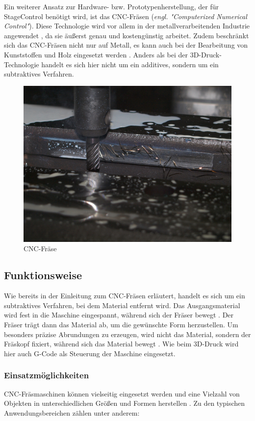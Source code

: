 Ein weiterer Ansatz zur Hardware- bzw. Prototypenherstellung, der für StageControl benötigt wird, ist das CNC-Fräsen (\textit{engl. "Computerized Numerical Control"}). Diese Technologie wird vor allem in der metallverarbeitenden Industrie angewendet \parencite{CNCFraesen}, da sie äußerst genau und kostengünstig arbeitet. Zudem beschränkt sich das CNC-Fräsen nicht nur auf Metall, es kann auch bei der Bearbeitung von Kunststoffen und Holz eingesetzt werden \parencite{CNCFraesen2}. Anders als bei der 3D-Druck-Technologie handelt es sich hier nicht um ein additives, sondern um ein subtraktives Verfahren.\\  \parencite{CNCFraesen3}


\begin{figure}[H]
	\centering
	\includegraphics[width=0.6\linewidth]{images/CNC.jpg}
	\caption[CNC-Fräse]{CNC-Fräse}
	\label{fig:cnc-fraese}
\end{figure}

\subsection{Funktionsweise}
Wie bereits in der Einleitung zum CNC-Fräsen erläutert, handelt es sich um ein subtraktives Verfahren, bei dem Material entfernt wird. Das Ausgangsmaterial wird fest in die Maschine eingespannt, während sich der Fräser bewegt \parencite{CNCFraesen2}. Der Fräser trägt dann das Material ab, um die gewünschte Form herzustellen. Um besonders präzise Abrundungen zu erzeugen, wird nicht das Material, sondern der Fräskopf fixiert, während sich das Material bewegt  \parencite{CNCFraesen3}. Wie beim 3D-Druck wird hier auch G-Code als Steuerung der Maschine eingesetzt. \\


\newpage
\subsubsection{Einsatzmöglichkeiten}
CNC-Fräsmaschinen können vielseitig eingesetzt werden und eine Vielzahl von Objekten in unterschiedlichen Größen und Formen herstellen  \parencite{CNCFraesen2}. Zu den typischen Anwendungsbereichen zählen unter anderem:

